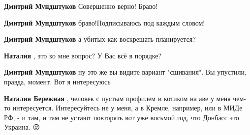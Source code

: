 \begin{itemize}
\begin{itemize}
\textbf{Дмитрий Мундштуков} Совершенно верно! Браво!

 
\textbf{Дмитрий Мундштуков} браво!Подписываюсь под каждым словом!

 
\textbf{Дмитрий Мундштуков} а убитых как воскрешать планируется?

 
\textbf{Наталия} , это ко мне вопрос? У Вас всё в порядке?

 
\textbf{Дмитрий Мундштуков} ну это же вы видите вариант "сшивания". Вы упустили, правда, момент. Вот я интересуюсь

 
\textbf{Наталия Бережная} , человек с пустым профилем и котиком на аве у меня чем-то интересуется. \Laughey[1.0][white] Интересуйтесь не у меня, а в Кремле, например, или в МИДе РФ, - и там, и там не устают повторять вот уже восьмой год, что Донбасс это Украина. 😜

 

\end{itemize}
\end{itemize}
